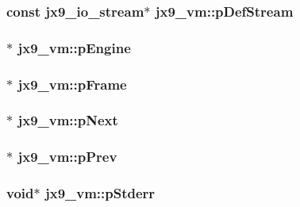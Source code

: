 \hypertarget{structjx9__vm_ae81b7c03ba55caff75ca8b56157df30b}{
\subsubsection[{p\-Def\-Stream}]{\setlength{\rightskip}{0pt plus 5cm}const {\bf jx9\-\_\-io\-\_\-stream}$\ast$ jx9\-\_\-vm\-::p\-Def\-Stream}}\label{d1/d16/structjx9__vm_ae81b7c03ba55caff75ca8b56157df30b}
\hypertarget{structjx9__vm_ab1f7b6baaf3160178dfd6e9f7c340f5c}{
\subsubsection[{p\-Engine}]{$\ast$ jx9\-\_\-vm\-::p\-Engine}}\label{d1/d16/structjx9__vm_ab1f7b6baaf3160178dfd6e9f7c340f5c}
\hypertarget{structjx9__vm_a3c5beb1fe1517e2cd1c6c41ffb972bf8}{
\subsubsection[{p\-Frame}]{$\ast$ jx9\-\_\-vm\-::p\-Frame}}\label{d1/d16/structjx9__vm_a3c5beb1fe1517e2cd1c6c41ffb972bf8}
\hypertarget{structjx9__vm_a57dbd018cb79387ce669c97fca83e9a1}{
\subsubsection[{p\-Next}]{$\ast$ jx9\-\_\-vm\-::p\-Next}}\label{d1/d16/structjx9__vm_a57dbd018cb79387ce669c97fca83e9a1}
\hypertarget{structjx9__vm_a0dad9b08026b3938a1adc1a4a9d59d0e}{
\subsubsection[{p\-Prev}]{ $\ast$ jx9\-\_\-vm\-::p\-Prev}}\label{d1/d16/structjx9__vm_a0dad9b08026b3938a1adc1a4a9d59d0e}
\hypertarget{structjx9__vm_a00249ae003ef89c4102e8c23dbb0d21c}{
\subsubsection[{p\-Stderr}]{\setlength{\rightskip}{0pt plus 5cm}void$\ast$ jx9\-\_\-vm\-::p\-Stderr}}\label{d1/d16/structjx9__vm_a00249ae003ef89c4102e8c23dbb0d21c}
